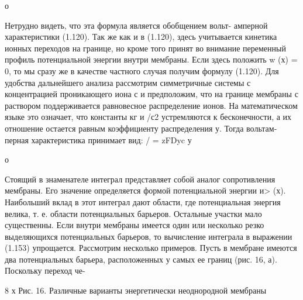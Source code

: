 {о

Нетрудно видеть, что эта формула является обобщением вольт- амперной характеристики (1.120). Так же как и в (1.120), здесь учитывается кинетика ионных переходов на границе, но кроме того принят во внимание переменный профиль потенциальной энергии внутри мембраны. Если здесь положить w (х) = 0, то мы сразу же в качестве частного случая получим формулу (1.120).
Для удобства дальнейшего анализа рассмотрим симметричные системы с концентрацией проникающего иона с и предположим, что на границе мембраны с раствором поддерживается равновесное распределение ионов. На математическом языке это означает, что константы кг и /с2 устремляются к бесконечности, а их отношение остается равным коэффициенту распределения у. Тогда вольтам- перная характеристика принимает вид:
/ = zFDyc у

о

Стоящий в знаменателе интеграл представляет собой аналог сопротивления мембраны. Его значение определяется формой потенциальной энергии и> (х). Наибольший вклад в этот интеграл дают области, где потенциальная энергия велика, т. е. области потенциальных барьеров. Остальные участки мало существенны. Если внутри мембраны имеется один или несколько резко выделяющихся потенциальных барьеров, то вычисление интеграла в выражении (1.153) упрощается. Рассмотрим несколько примеров.
Пусть в мембране имеются два потенциальных барьера, расположенных у самых ее границ (рис. 16, а). Поскольку переход че- 

8 х
Рис. 16. Различные варианты энергетически неоднородной мембраны

}
